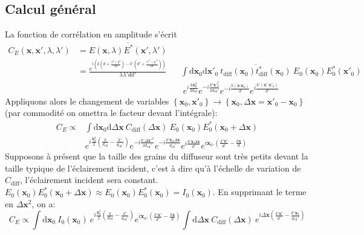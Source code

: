 \subsection{Calcul général}
La fonction de corrélation en amplitude s'écrit
\begin{align}
C_E(\mathbf{x},\mathbf{x}',\lambda,\lambda')&=\overline{E(\mathbf{x},\lambda) E^*(\mathbf{x}',\lambda')} \\
\nonumber &=\frac{e^{i \left( k (d+ \frac{x^2+y^2}{2d})-k'(d'+\frac{x'^2+y'^2}{2d'}) \right)}}{\lambda \lambda' d d'} 
&& \int{ \mathrm{d}\mathbf{x}_0 \mathrm{d}\mathbf{x}'_0 \: \overline{t_{\mathrm{diff}}(\mathbf{x}_0) t^*_{\mathrm{diff}}(\mathbf{x}_0)} \: E_0(\mathbf{x}_0) E^*_0(\mathbf{x}'_0)} \\ 
& && \; e^{i\frac{k \mathbf{x}^2_0}{2d_{\mathrm{eff}}}} e^{-i\frac{k' \mathbf{x}'^2_0}{2d_{\mathrm{eff}}'}} e^{-i\frac{k(\mathbf{x}.\mathbf{x}_0)}{d}} e^{i\frac{k'(\mathbf{x}'.\mathbf{x}'_0)}{d'}}
\end{align}
Appliquons alors le changement de variables $\left\lbrace \mathbf{x}_0, \mathbf{x}'_0\right\rbrace \rightarrow \left\lbrace \mathbf{x}_0, \Delta\mathbf{x}= \mathbf{x}'_0-\mathbf{x}_0\right\rbrace$ (par commodité on omettra le facteur devant l'intégrale):
\begin{align}
  C_E \propto &\int{\mathrm{d}\mathbf{x}_0 \mathrm{d}\Delta\mathbf{x} \: C_{\mathrm{diff}}(\Delta\mathbf{x}) \: E_0(\mathbf{x}_0)E^*_0(\mathbf{x}_0+\Delta\mathbf{x})} \\ 
  \nonumber & e^{i \frac{\mathbf{x}^2_0}{2}(\frac{k}{d_{\mathrm{eff}}}-\frac{k'}{d_{\mathrm{eff}}'})} e^{-i\frac{k'\Delta\mathbf{x}'^2}{2d_{\mathrm{eff}}'}} e^{-i\frac{k'\mathbf{x}_0 \Delta\mathbf{x}}{d_{\mathrm{eff}}'}} e^{i\frac{k'\mathbf{x} \Delta\mathbf{x}}{d'}} e^{i \mathbf{x}_0.(\frac{k'\mathbf{x}'}{d'}-\frac{k\mathbf{x}}{d})}
\end{align}
Supposons à présent que la taille des grains du diffuseur sont très petits devant la taille typique de l'éclairement incident, c'est à dire qu'à l'échelle de variation de $C_{\mathrm{diff}}$, l'éclairement incident sera constant. $E_0(\mathbf{x}_0)E^*_0(\mathbf{x}_0+\Delta\mathbf{x}) \approx E_0(\mathbf{x}_0)E^*_0(\mathbf{x}_0)=I_0(\mathbf{x}_0)$. En supprimant le terme en $\Delta\mathbf{x}^2$, on a: 
\begin{equation}
C_E \propto \int{\mathrm{d}\mathbf{x}_0  \: I_0(\mathbf{x}_0) \: e^{i \frac{\mathbf{x}^2_0}{2}(\frac{k}{d_{\mathrm{eff}}}-\frac{k'}{d_{\mathrm{eff}}'})} e^{i \mathbf{x}_0.(\frac{k'\mathbf{x}'}{d'}-\frac{k\mathbf{x}}{d})} \int{\mathrm{d}\Delta\mathbf{x} \: C_{\mathrm{diff}}(\Delta\mathbf{x}) \: e^{i \Delta\mathbf{x} (\frac{k'\mathbf{x}'}{d'}-\frac{k'\mathbf{x}_0}{d_{\mathrm{eff}}'})}}}
\end{equation}
